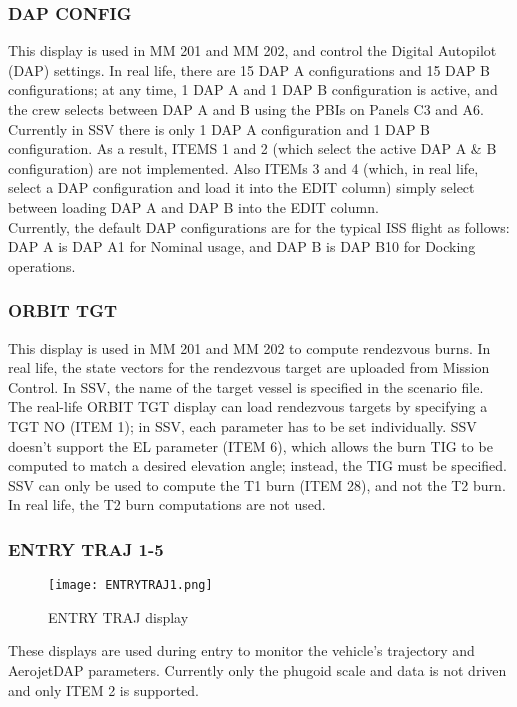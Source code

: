\documentclass[Space_Shuttle_Vessel_Manual.tex]{subfiles}
\begin{document}
\begin{multicols*}{2}
\subsubsection{DAP CONFIG}
This display is used in MM 201 and MM 202, and control the Digital Autopilot (DAP) settings. In real life, there are 15 DAP A configurations and 15 DAP B configurations; at any time, 1 DAP A and 1 DAP B configuration is active, and the crew selects between DAP A and B using the PBIs on Panels C3 and A6. Currently in SSV there is only 1 DAP A configuration and 1 DAP B configuration. As a result, ITEMS 1 and 2 (which select the active DAP A \& B configuration) are not implemented. Also ITEMs 3 and 4 (which, in real life, select a DAP configuration and load it into the EDIT column) simply select between loading DAP A and DAP B into the EDIT column.\\
Currently, the default DAP configurations are for the typical ISS flight as follows: DAP A is DAP A1 for Nominal usage, and DAP B is DAP B10 for Docking operations. 

\subsubsection{ORBIT TGT}
This display is used in MM 201 and MM 202 to compute rendezvous burns. In real life, the state vectors for the rendezvous target are uploaded from Mission Control. In SSV, the name of the target vessel is specified in the scenario file.
The real-life ORBIT TGT display can load rendezvous targets by specifying a TGT NO (ITEM 1); in SSV, each parameter has to be set individually. SSV doesn't support the EL parameter (ITEM 6), which allows the burn TIG to be computed to match a desired elevation angle; instead, the TIG must be specified.
SSV can only be used to compute the T1 burn (ITEM 28), and not the T2 burn. In real life, the T2 burn computations are not used.

\subsubsection{ENTRY TRAJ 1-5}
\begin{figure}[H]
  \texttt{[image: ENTRYTRAJ1.png]}
  \caption{ENTRY TRAJ display}
  \label{fig:ENTRY_TRAJ}
\end{figure}
These displays are used during entry to monitor the vehicle's trajectory and AerojetDAP parameters. Currently only the phugoid scale and data is not driven and only ITEM 2 is supported.


\end{multicols*}
\end{document}
